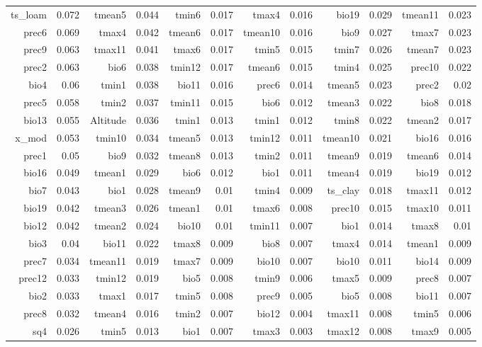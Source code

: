 \documentclass[11pt]{article}
\begin{document}
\begin{linenumbers}
\begin{flushleft}
\begin{table}[htbp]
\begin{tabular}{rrrrrrrrrrrr}
    ts\_loam & 0.072 & tmean5 & 0.044 & tmin6 & 0.017 & tmax4 & 0.016 & bio19 & 0.029 & tmean11 & 0.023 \\
    prec6 & 0.069 & tmax4 & 0.042 & tmean6 & 0.017 & tmean10 & 0.016 & bio9  & 0.027 & tmax7 & 0.023 \\
    prec9 & 0.063 & tmax11 & 0.041 & tmax6 & 0.017 & tmin5 & 0.015 & tmin7 & 0.026 & tmean7 & 0.023 \\
    prec2 & 0.063 & bio6  & 0.038 & tmin12 & 0.017 & tmean6 & 0.015 & tmin4 & 0.025 & prec10 & 0.022 \\
    bio4  & 0.06  & tmin1 & 0.038 & bio11 & 0.016 & prec6 & 0.014 & tmean5 & 0.023 & prec2 & 0.02 \\
    prec5 & 0.058 & tmin2 & 0.037 & tmin11 & 0.015 & bio6  & 0.012 & tmean3 & 0.022 & bio8  & 0.018 \\
    bio13 & 0.055 & Altitude & 0.036 & tmin1 & 0.013 & tmin1 & 0.012 & tmin8 & 0.022 & tmean2 & 0.017 \\
    x\_mod & 0.053 & tmin10 & 0.034 & tmean5 & 0.013 & tmin12 & 0.011 & tmean10 & 0.021 & bio16 & 0.016 \\
    prec1 & 0.05  & bio9  & 0.032 & tmean8 & 0.013 & tmin2 & 0.011 & tmean9 & 0.019 & tmean6 & 0.014 \\
    bio16 & 0.049 & tmean1 & 0.029 & bio6  & 0.012 & bio1  & 0.011 & tmean4 & 0.019 & bio19 & 0.012 \\
    bio7  & 0.043 & bio1  & 0.028 & tmean9 & 0.01  & tmin4 & 0.009 & ts\_clay & 0.018 & tmax11 & 0.012 \\
    bio19 & 0.042 & tmean3 & 0.026 & tmean1 & 0.01  & tmax6 & 0.008 & prec10 & 0.015 & tmax10 & 0.011 \\
    bio12 & 0.042 & tmean2 & 0.024 & bio10 & 0.01  & tmin11 & 0.007 & bio1  & 0.014 & tmax8 & 0.01 \\
    bio3  & 0.04  & bio11 & 0.022 & tmax8 & 0.009 & bio8  & 0.007 & tmax4 & 0.014 & tmean1 & 0.009 \\
    prec7 & 0.034 & tmean11 & 0.019 & tmax7 & 0.009 & bio10 & 0.007 & bio10 & 0.011 & bio14 & 0.009 \\
    prec12 & 0.033 & tmin12 & 0.019 & bio5  & 0.008 & tmin9 & 0.006 & tmax5 & 0.009 & prec8 & 0.007 \\
    bio2  & 0.033 & tmax1 & 0.017 & tmin5 & 0.008 & prec9 & 0.005 & bio5  & 0.008 & bio11 & 0.007 \\
    prec8 & 0.032 & tmean4 & 0.016 & tmin2 & 0.007 & bio12 & 0.004 & tmax11 & 0.008 & tmin5 & 0.006 \\
    sq4   & 0.026 & tmin5 & 0.013 & bio1  & 0.007 & tmax3 & 0.003 & tmax12 & 0.008 & tmax9 & 0.005 \\

\end{tabular}
\end{table}
\end{flushleft}
\end{linenumbers}
\end{document}
